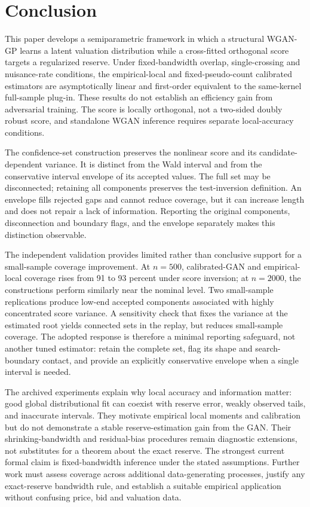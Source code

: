 \section{Conclusion}

This paper develops a semiparametric framework in which a structural WGAN-GP
learns a latent valuation distribution while a cross-fitted orthogonal score
targets a regularized reserve. Under fixed-bandwidth overlap, single-crossing
and nuisance-rate conditions, the empirical-local and fixed-pseudo-count
calibrated estimators are asymptotically linear and first-order equivalent to
the same-kernel full-sample plug-in. These results do not establish an
efficiency gain from adversarial training. The score is locally orthogonal,
not a two-sided doubly robust score, and standalone WGAN inference requires
separate local-accuracy conditions.

The confidence-set construction preserves the nonlinear score and its
candidate-dependent variance. It is distinct from the Wald interval and from
the conservative interval envelope of its accepted values. The full set may
be disconnected; retaining all components preserves the test-inversion
definition. An envelope fills rejected gaps and cannot reduce coverage, but
it can increase length and does not repair a lack of information. Reporting
the original components, disconnection and boundary flags, and the envelope
separately makes this distinction observable.

The independent validation provides limited rather than conclusive support
for a small-sample coverage improvement. At $n=500$, calibrated-GAN and
empirical-local coverage rises from 91 to 93 percent under score inversion;
at $n=2000$, the constructions perform similarly near the nominal level.
Two small-sample replications produce low-end accepted components associated
with highly concentrated score variance. A sensitivity check that fixes the
variance at the estimated root yields connected sets in the replay, but
reduces small-sample coverage. The adopted response is therefore a minimal
reporting safeguard, not another tuned estimator: retain the complete set,
flag its shape and search-boundary contact, and provide an explicitly
conservative envelope when a single interval is needed.

The archived experiments explain why local accuracy and information matter:
good global distributional fit can coexist with reserve error, weakly observed
tails, and inaccurate intervals. They motivate empirical local moments and
calibration but do not demonstrate a stable reserve-estimation gain from
the GAN. Their shrinking-bandwidth and residual-bias procedures remain
diagnostic extensions, not substitutes for a theorem about the exact reserve.
The strongest current formal claim is fixed-bandwidth inference under the
stated assumptions. Further work must assess coverage across additional
data-generating processes, justify any exact-reserve bandwidth rule, and
establish a suitable empirical application without confusing price, bid and
valuation data.
